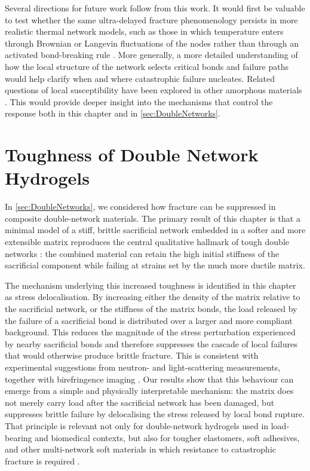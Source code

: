 \documentclass[asymmetricmargins]{library/duthesis}%
\begin{document}
Several directions for future work follow from this work. It would first be valuable to test whether the same ultra-delayed fracture phenomenology persists in more realistic thermal network models, such as those in which temperature enters through Brownian or Langevin fluctuations of the nodes rather than through an activated bond-breaking rule \cite{tauber_role_2020}. More generally, a more detailed understanding of how the local structure of the network selects critical bonds and failure paths would help clarify when and where catastrophic failure nucleates. Related questions of local susceptibility have been explored in other amorphous materials \cite{mattsson_time-dependent_2017,cipelletti_microscopic_2020,aime_microscopic_2018}. This would provide deeper insight into the mechanisms that control the response both in this chapter and in \cref{sec:DoubleNetworks}.

\section*{Toughness of Double Network Hydrogels}
In \cref{sec:DoubleNetworks}, we considered how fracture can be suppressed in composite double-network materials. The primary result of this chapter is that a minimal model of a stiff, brittle sacrificial network embedded in a softer and more extensible matrix reproduces the central qualitative hallmark of tough double networks \cite{gong_double-network_2003,gong_why_2010,ducrot_toughening_2014,millereauMechanicsElastomericMolecular2018,kingMacroscaleDoubleNetworks2019,takahashiCreatingStiffTough2018}: the combined material can retain the high initial stiffness of the sacrificial component while failing at strains set by the much more ductile matrix.

The mechanism underlying this increased toughness is identified in this chapter as stress delocalisation. By increasing either the density of the matrix relative to the sacrificial network, or the stiffness of the matrix bonds, the load released by the failure of a sacrificial bond is distributed over a larger and more compliant background. This reduces the magnitude of the stress perturbation experienced by nearby sacrificial bonds and therefore suppresses the cascade of local failures that would otherwise produce brittle fracture. This is consistent with experimental suggestions from neutron- and light-scattering measurements, together with birefringence imaging \cite{ducrot_structure_2015,tominaga_molecular_2007,huang_importance_2007,zheng_how_2021,Orr2026}. Our results show that this behaviour can emerge from a simple and physically interpretable mechanism: the matrix does not merely carry load after the sacrificial network has been damaged, but suppresses brittle failure by delocalising the stress released by local bond rupture. That principle is relevant not only for double-network hydrogels used in load-bearing and biomedical contexts, but also for tougher elastomers, soft adhesives, and other multi-network soft materials in which resistance to catastrophic fracture is required \cite{gong_why_2010,millereauMechanicsElastomericMolecular2018,kingMacroscaleDoubleNetworks2019,takahashiCreatingStiffTough2018}.
\end{document}

